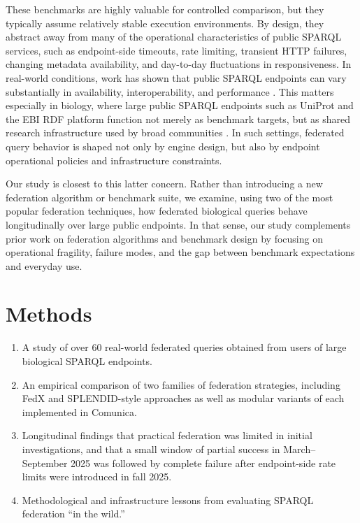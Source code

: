 \documentclass[runningheads]{llncs}
\begin{document}
These benchmarks are highly valuable for controlled comparison, but they typically assume relatively stable execution environments. 
By design, they abstract away from many of the operational characteristics of public SPARQL services, such as endpoint-side timeouts, rate limiting, transient HTTP failures, changing metadata availability, and day-to-day fluctuations in responsiveness. 
In real-world conditions, work has shown that public SPARQL endpoints can vary substantially in availability, interoperability, and performance \cite{Vandenbussche2017SPARQLES}. 
This matters especially in biology, where large public SPARQL endpoints such as UniProt and the EBI RDF platform function not merely as benchmark targets, but as shared research infrastructure used by broad communities \cite{Jupp2014EBIRDF,UniProt2025}. 
In such settings, federated query behavior is shaped not only by engine design, but also by endpoint operational policies and infrastructure constraints.

Our study is closest to this latter concern. 
Rather than introducing a new federation algorithm or benchmark suite, we examine, using two of the most popular federation techniques, how federated biological queries behave longitudinally over large public endpoints. 
In that sense, our study complements prior work on federation algorithms and benchmark design by focusing on operational fragility, failure modes, and the gap between benchmark expectations and everyday use.


\section{Methods}\label{sec3}

\begin{enumerate}
    \item A study of over 60 real-world federated queries obtained from users of large biological SPARQL endpoints.
    \item An empirical comparison of two families of federation strategies, including FedX and SPLENDID-style approaches as well as modular variants of each implemented in Comunica.
    \item Longitudinal findings that practical federation was limited in initial investigations, and that a small window of partial success in March–September 2025 was followed by complete failure after endpoint-side rate limits were introduced in fall 2025.
    \item Methodological and infrastructure lessons from evaluating SPARQL federation “in the wild.”
\end{enumerate}
\end{document}
